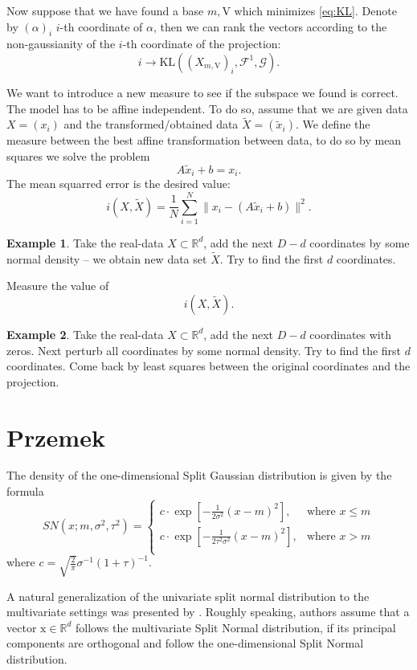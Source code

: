\documentclass[12pt]{article}
\def\R{\mathbb{R}}
\def\v{\mathrm{V}}
\def\x{\mathrm{x}}
\def\F{\mathcal{F}}
\def\G{\mathcal{G}}
\def\KL{\mathrm{KL}}
\theoremstyle{definition}
\newtheorem{example}{Example}[section]
\begin{document}
Now suppose that we have found a base $m,\v$ which minimizes \eqref{eq:KL}.
Denote by $(\alpha)_i$
$i$-th coordinate of $\alpha$, then we can rank the vectors according to the non-gaussianity of the $i$-th coordinate of the projection:
$$
i \to \KL((X_{m,\v})_i,\F^1,\G).
$$
 
We want to introduce a new measure to see if the subspace we found is correct.
The model has to be affine independent. To do so, assume that we are given
data $X=(x_i)$ and the transformed/obtained data $\tilde X=(\tilde x_i)$.
We define the measure between the best affine transformation between data, to do 
so by mean squares we solve the problem
$$
A\tilde x_i+b=x_i.
$$
The mean squarred error is the desired value:
$$
i(X,\tilde X)=\frac{1}{N}\sum_{i=1}^N \|x_i-(A\tilde x_i+b)\|^2.
$$
 
\begin{example}
Take the real-data $X \subset \R^d$, add the next $D-d$ coordinates by some normal density -- we obtain new data set $\tilde X$. Try to find the first $d$ coordinates. 

Measure the value of
$$
i(X,\tilde X).
$$
\end{example}
 
\begin{example}
Take the real-data $X \subset \R^d$, add the next $D-d$ coordinates with zeros.
Next perturb all coordinates by some normal density. Try to find the first $d$ coordinates. Come back by least squares between the original coordinates and the projection.
\end{example}
 
\section{Przemek}

 The density of the one-dimensional Split Gaussian distribution is given by the formula
$$
SN(x;m,\sigma^2,\tau^2) = \left\{ \begin{array}{ll}
c \cdot \exp[-\frac{1}{2\sigma^2}(x-m)^2], & \textrm{where $x\leq m$}\\
c \cdot \exp[-\frac{1}{2\tau^2\sigma^2}(x-m)^2], & \textrm{where $x>m$}\\
\end{array} \right.
$$
where $c=\sqrt{\frac{2}{\pi}}\sigma^{-1}(1+\tau)^{-1}$. 

A natural generalization of the univariate split normal distribution to the multivariate settings was presented by \cite{villani2006multivariate}.
Roughly speaking, authors assume that a vector $\x \in \R^d$ follows the multivariate Split Normal distribution, if its principal components are orthogonal and follow the one-dimensional Split Normal distribution.
\end{document}

